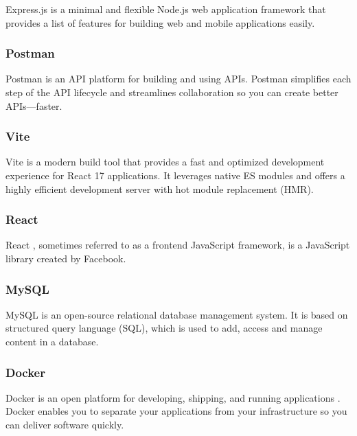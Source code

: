 Express.js \cite{ExpressJSWebsite} is a minimal and flexible Node.js \cite{NodeJSWebsite} web application framework that provides a list of features for building web and mobile applications easily.

\subsubsection*{\protect{} Postman}

Postman \cite{PostmanWebsite} is an API platform for building and using APIs. Postman simplifies each step of the API lifecycle and streamlines collaboration so you can create better APIs—faster.

\subsubsection*{\protect{} Vite}

Vite \cite{ViteJSWebsite} is a modern build tool that provides a fast and optimized development experience for React 17 applications. It leverages native ES modules and offers a highly efficient development server with hot module replacement (HMR).

\subsubsection*{\protect{} React}

React \cite{ReactWebsite}, sometimes referred to as a frontend JavaScript framework, is a JavaScript library created by Facebook.

\subsubsection*{\protect{} MySQL}

MySQL \cite{MySQLWebsite} is an open-source relational database management system. It is based on structured query language (SQL), which is used to add, access and manage content in a database.

\subsubsection*{\protect{} Docker}

Docker is an open platform for developing, shipping, and running applications \cite{DockerArchitecture2023}. Docker enables you to separate your applications from your infrastructure so you can deliver software quickly.

